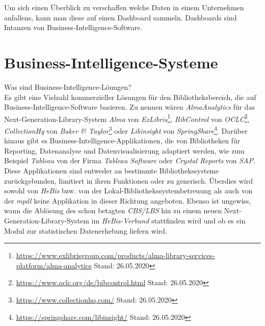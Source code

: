 Um sich einen Überblick zu verschaffen welche Daten in einem Unternehmen anfallens, kann man diese auf einen Dashboard sammeln.
Dashboards sind Intanzen von Business-Intelligence-Software.





\clearpage
\section{Business-Intelligence-Systeme}

Was sind Business-Intelligence-Löungen?\\
Es gibt eine Vielzahl kommerzieller Lösungen für den Bibliotheksbereich, die auf Business-Intelligence-Software basieren.
Zu nennen wären \textit{AlmaAnalytics} für das Next-Generation-Library-System \textit{Alma} von \textit{ExLibris}\footnote{\url{https://www.exlibrisgroup.com/products/alma-library-services-platform/alma-analytics}
Stand: 26.05.2020}, \textit{BibControl} von \textit{OCLC}\footnote{\url{https://www.oclc.org/de/bibcontrol.html} Stand: 26.05.2020},
\textit{CollectionHq} von \textit{Baker \& Taylor}\footnote{\url{https://www.collectionhq.com/} Stand: 26.05.2020} oder \textit{Libinsight} von \textit{SpringShare}\footnote{\url{https://springshare.com/libinsight/} Stand: 26.05.2020}.
Darüber hinaus gibt es Business-Intelligence-Applikationen, die von
Bibliotheken für Reporting, Datenanalyse und Datenvisualisierung adaptiert werden,
wie zum Beispiel \textit{Tableau} von der Firma \textit{Tableau Software} oder
\textit{Crystal Reports} von \textit{SAP}.
Diese Applikationen sind entweder
an bestimmte Bibliothekssysteme zurückgebunden, limitiert in ihren
Funktionen\cite{golas_statistische_2018} oder zu generisch.
Überdies wird sowohl von \textit{HeBis} bzw. von der
Lokal-Bibliothekssystembetreuung als auch von der \textit{mpdl} keine Applikation
in dieser Richtung angeboten.
Ebenso ist ungewiss, wann die Ablösung des schon betagten \textit{CBS/LBS} hin zu
einem neuen Next-Generation-Library-System im \textit{HeBis-Verbund} stattfinden wird und ob
es ein Modul zur statistischen Datenerhebung liefern wird.
